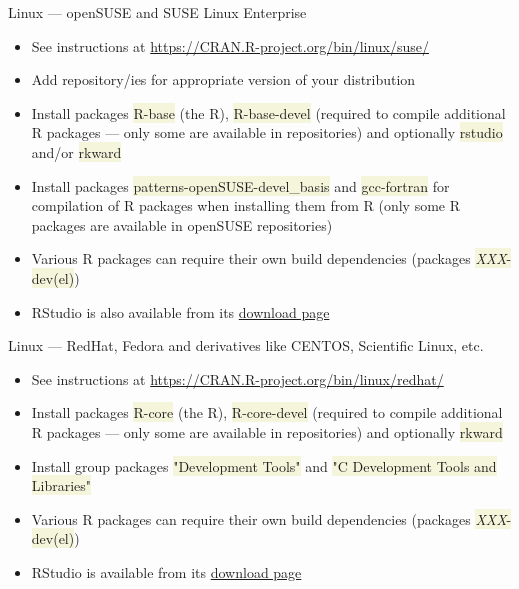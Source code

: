 \documentclass[compress, xelatex, 11pt, xcolor=svgnames, aspectratio=169,
	hyperref={
		bookmarks=true,
		unicode=true,
		colorlinks=true,
		pdftitle={Molecular data in R},
		plainpages=false,
		pdfauthor={Vojtech Zeisek},
		pdfsubject={Course about phylogeny and evolution in R},
		pdfcreator={XeLaTeX},
		pdfkeywords={R, evolution, phylogeny, molecular data},
		linkcolor=Crimson, %
		anchorcolor=Magenta, %
		citecolor=Magenta, %
		filecolor=Magenta, %
		menucolor=Magenta, %
		urlcolor=DodgerBlue, %
		},
	url={hyphens, lowtilde} %
	]{beamer}
\renewcommand{\texttt}[1]{\colorbox{Beige}{{\ttfamily #1}}}
\begin{document}
\begin{frame}{Linux --- openSUSE and SUSE Linux Enterprise}
	\begin{itemize}
		\item See instructions at \url{https://CRAN.R-project.org/bin/linux/suse/}
		\item Add repository/ies for appropriate version of your distribution
		\begin{itemize}
		\end{itemize}
		\item Install packages \texttt{R-base} (the R), \texttt{R-base-devel} (required to compile additional R packages --- only some are available in repositories) and optionally \texttt{rstudio} and/or \texttt{rkward}
		\item Install packages \texttt{patterns-openSUSE-devel\_basis} and \texttt{gcc-fortran} for compilation of R packages when installing them from R (only some R packages are available in openSUSE repositories)
		\item Various R packages can require their own build dependencies (packages \texttt{\textit{XXX}-dev(el)})
		\item RStudio is also available from its \href{https://posit.co/products/open-source/rstudio/download/}{download page}
	\end{itemize}
\end{frame}

\begin{frame}{Linux --- RedHat, Fedora and derivatives like CENTOS, Scientific Linux, etc.}
	\begin{itemize}
		\item See instructions at \url{https://CRAN.R-project.org/bin/linux/redhat/}
		\item Install packages \texttt{R-core} (the R), \texttt{R-core-devel} (required to compile additional R packages --- only some are available in repositories) and optionally \texttt{rkward}
		\item Install group packages \texttt{"Development Tools"} and \texttt{"C Development Tools and Libraries"}
		\item Various R packages can require their own build dependencies (packages \texttt{\textit{XXX}-dev(el)})
		\item RStudio is available from its \href{https://posit.co/products/open-source/rstudio/download/}{download page}
	\end{itemize}
\end{frame}
\end{document}

